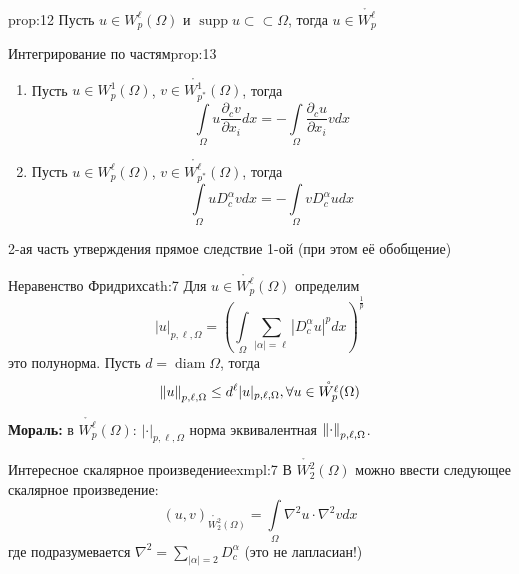 \documentclass[12pt,a4paper]{article}
\newcommand{\intset}[1]{\int\limits_{#1}}
\newcommand{\ssubset}{\subset \subset}
\DeclareMathOperator\supp{supp}
\DeclareMathOperator\diam{diam}
\begin{document}
\begin{proposition}{}{prop:12}
	Пусть $u \in W_p^\ell (\Omega)$ и $\supp{u} \ssubset \Omega$, тогда $u \in \mathring{W_p^\ell}$
\end{proposition}

\begin{proposition}{Интегрирование по частям}{prop:13}
	\begin{enumerate}
		\item Пусть $u \in W_p^1 (\Omega)$, $v \in \mathring{W_{p^*}^1} (\Omega)$, тогда
			\begin{equation*}
			\intset{\Omega}{u \frac{\partial_c v}{\partial x_i} dx} = -\intset{\Omega}{\frac{\partial_c u}{\partial x_i} v dx}
			\end{equation*}
		\item Пусть $u \in W_p^\ell (\Omega)$, $v \in \mathring{W_{p^*}^\ell} (\Omega)$, тогда
			\begin{equation*}
			\intset{\Omega}{u D_c^\alpha v dx} = -\intset{\Omega}{v D_c^\alpha u dx}
			\end{equation*}
	\end{enumerate}
	2-ая часть утверждения прямое следствие 1-ой (при этом её обобщение)
\end{proposition}

\begin{theorem}{Неравенство Фридрихса}{th:7}
	Для $u \in \mathring{W_p^\ell} (\Omega)$ определим 
	\begin{equation*}
		|u|_{p, \ell, \Omega} = \left(\intset{\Omega}{\sum_{|\alpha| = \ell}{|D_c^\alpha u|^p} dx}\right)^{\frac{1}{p}}
	\end{equation*}
	это полунорма. Пусть $d = \diam{\Omega}$, тогда
	\begin{equation*}
		\norm{u}_{p, \ell, \Omega} \leq d^\ell |u|_{p, \ell, \Omega}, \forall u \in \mathring{W_p^\ell} (\Omega)
	\end{equation*}
\end{theorem}
\textbf{Мораль:} в $\mathring{W_p^\ell} (\Omega)$: $|\cdot|_{p, \ell, \Omega}$ норма эквивалентная $\norm{\cdot}_{p, \ell, \Omega}$.

\begin{example}{Интересное скалярное произведение}{exmpl:7}
	В $\mathring{W_2^2} (\Omega)$ можно ввести следующее скалярное произведение:
	\begin{equation*}
		(u, v)_{\mathring{W_2^2} (\Omega)} = \intset{\Omega}{\nabla^2 u \cdot \nabla^2 v dx}
	\end{equation*}
	где подразумевается $\nabla^2 = \sum\limits_{|\alpha| = 2}{D_c^\alpha}$ (это не лапласиан!)
\end{example}
\end{document}
